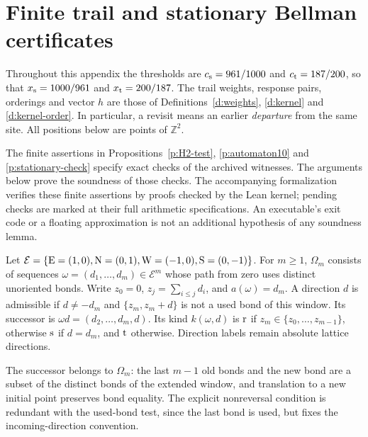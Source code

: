 
\section{Finite trail and stationary Bellman certificates}

Throughout this appendix the thresholds are
\(c_{\rm s}=961/1000\) and \(c_{\rm t}=187/200\), so that
\(x_{\rm s}=1000/961\) and \(x_{\rm t}=200/187\).
The trail weights, response pairs, orderings and vector \(h\) are
those of Definitions~\ref{d:weights}, \ref{d:kernel} and
\ref{d:kernel-order}. In particular, a revisit means an earlier
\emph{departure} from the same site. All positions below are points
of \(\mathbb Z^2\).

The finite assertions in Propositions~\ref{p:H2-test},
\ref{p:automaton10} and \ref{p:stationary-check} specify exact checks
of the archived witnesses. The arguments below prove the soundness
of those checks. The accompanying formalization verifies these finite
assertions by proofs checked by the Lean kernel; pending checks are
marked at their full arithmetic specifications. An executable's exit
code or a floating approximation is not an additional hypothesis of
any soundness lemma.

\begin{definition}\label{d:memory-automaton}
Let \(\mathcal E=\{{\rm E}=(1,0),{\rm N}=(0,1),
{\rm W}=(-1,0),{\rm S}=(0,-1)\}\).
For \(m\ge1\), \(\Omega_m\) consists of sequences
\(\omega=(d_1,\ldots,d_m)\in\mathcal E^m\) whose path from zero
uses distinct unoriented bonds. Write \(z_0=0\),
\(z_j=\sum_{i\le j}d_i\), and \(a(\omega)=d_m\).
A direction \(d\) is admissible if \(d\ne-d_m\) and
\(\{z_m,z_m+d\}\) is not a used bond of this window.
Its successor is \(\omega d=(d_2,\ldots,d_m,d)\).
Its kind \(k(\omega,d)\) is \({\rm r}\) if
\(z_m\in\{z_0,\ldots,z_{m-1}\}\), otherwise \({\rm s}\)
if \(d=d_m\), and \({\rm t}\) otherwise.
Direction labels remain absolute lattice directions.
\end{definition}

The successor belongs to \(\Omega_m\): the last \(m-1\) old bonds
and the new bond are a subset of the distinct bonds of the extended
window, and translation to a new initial point preserves bond equality.
The explicit nonreversal condition is redundant with the used-bond
test, since the last bond is used, but fixes the incoming-direction
convention.

